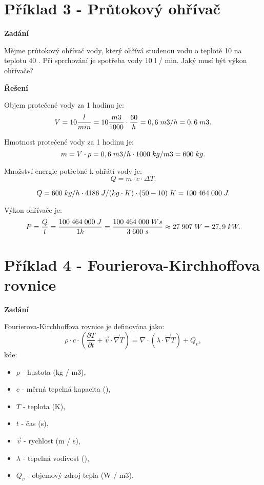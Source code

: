 \documentclass{article}
\begin{document}
\section*{Příklad 3 - Průtokový ohřívač}

\textbf{Zadání}

Mějme průtokový ohřívač vody, který ohřívá studenou vodu o teplotě 10 \ueqCELS \myFS na teplotu 40 \ueqCELS. Při sprchování je spotřeba vody 10 l / min. Jaký musí být výkon ohřívače?

\textbf{Řešení}

Objem protečené vody za 1 hodinu je:
$$
    V = 10 \frac{l}{min} = 10 \frac{m3}{1000} \cdot \frac{60}{h} = 0,6 \; m3/h = 0,6 \; m3.
$$

Hmotnost protečené vody za 1 hodinu je:
$$
    m = V \cdot \rho = 0,6 \; m3/h \cdot 1 000 \; kg/m3 = 600 \; kg.
$$

Množství energie potřebné k ohřátí vody je:
$$
    Q = m \cdot c \cdot \Delta T.
$$

$$
    Q = 600 \; kg/h \cdot 4 186 \; J/ (kg \cdot K) \cdot (50 - 10) \; K = 100 \; 464 \; 000 \; J.
$$

Výkon ohřívače je:
$$
    P = \frac{Q}{t} = \frac{100 \; 464 \; 000 \; J}{1 h} = \frac{100 \; 464 \; 000 \; Ws}{3 \; 600 \; s} \approx 27 \; 907 \; W = 27,9 \; kW.
$$



\section*{Příklad 4 - Fourierova-Kirchhoffova rovnice}

\textbf{Zadání}

Fourierova-Kirchhoffova rovnice je definována jako:
\begin{equation}
    \rho \cdot c \cdot \left( \frac{\partial T}{\partial t} + \vec{v} \cdot \vec{\nabla} T \right) = \nabla \cdot \left( \lambda \cdot \vec{\nabla} T \right) + Q_v,
\end{equation}
kde:
\begin{itemize}
    \item $\rho$ - hustota (kg / m3),
    \item $c$ - měrná tepelná kapacita (\ueqJperKGperK),
    \item $T$ - teplota (K),
    \item $t$ - čas (s),
    \item $\vec{v}$ - rychlost (m / s),
    \item $\lambda$ - tepelná vodivost (\ueqWperMsqperK),
    \item $Q_v$ - objemový zdroj tepla (W / m3).
\end{itemize}
\end{document}
